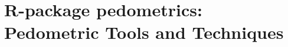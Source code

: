 \artigofalse
\chapter{R-package pedometrics: Pedometric Tools and Techniques}
\label{apen:pedometrics}

% 

